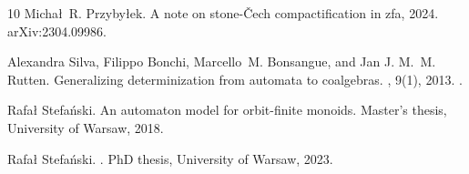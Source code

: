 \documentclass[10pt,a4paper]{amsart}
\numberwithin{equation}{section}
\theoremstyle{plain}
\begin{document}
\begin{thebibliography}{10}
Michał~R. Przybyłek.
\newblock A note on stone-Čech compactification in zfa, 2024.
\newblock arXiv:2304.09986.

Alexandra Silva, Filippo Bonchi, Marcello~M. Bonsangue, and Jan J. M.~M.
  Rutten.
\newblock Generalizing determinization from automata to coalgebras.
, 9(1), 2013.
\newblock \href {https://doi.org/10.2168/LMCS-9(1:9)2013}
  {}.

Rafa{\l} Stefa{\'n}ski.
\newblock An automaton model for orbit-finite monoids.
\newblock Master's thesis, University of Warsaw, 2018.

Rafa{\l} Stefa{\'n}ski.
.
\newblock PhD thesis, University of Warsaw, 2023.

\end{thebibliography}
\end{document}
